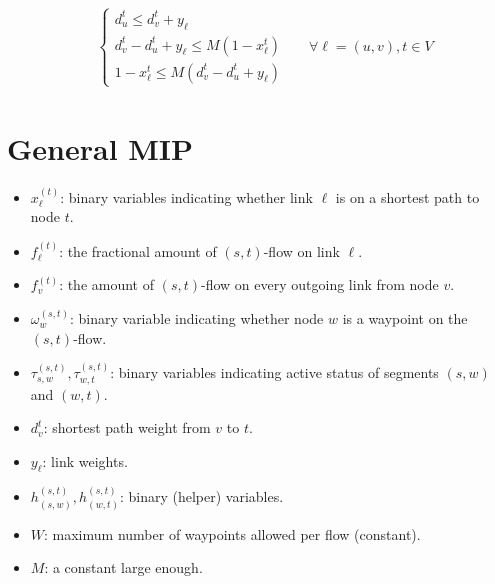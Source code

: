 \documentclass[a4paper,USenglish]{lipics-v2018}
\begin{document}
\begin{align}
\\ 
&\begin{cases*}
d^{t}_u \leq d^{t}_v + y_{\ell} \\
d^{t}_v - d^{t}_u + y_{\ell} \leq M(1 - x^t_{\ell})	\\
1 - x^t_{\ell} \leq M(d^{t}_v - d^{t}_u + y_{\ell})
\end{cases*}
&& \forall \ell = (u,v),  t \in V
\label{LP:weights} 
\end{align}


\section{General MIP}
\begin{itemize}
\item	
	$x^{(t)}_{\ell}$:	binary variables indicating whether link $\ell$ is on a shortest path to node $t$.
\item	
	$f^{(t)}_{\ell}$: the fractional amount of $(s,t)$-flow on link $\ell$.
\item	
	$f^{(t)}_{v}$:  the amount of $(s,t)$-flow on every outgoing link from node $v$.
\item
	$\omega^{(s,t)}_{w}$: binary variable indicating whether node $w$ is a waypoint on the $(s,t)$-flow. 
\item $\tau^{(s,t)}_{s,w}, \tau^{(s,t)}_{w,t}$: binary variables indicating active status of segments $(s,w)$ and $(w,t)$.
\item
	$d^{t}_v$: shortest path weight from $v$ to $t$.
\item	
	$y_{\ell}$: link weights.
\item	
	$h^{(s,t)}_{(s,w)}, h^{(s,t)}_{(w,t)}$: binary (helper) variables.
\item
	$W$: maximum  number of waypoints allowed per flow (constant).
\item
	$M$: a constant large enough.	
\end{itemize}
\end{document}
